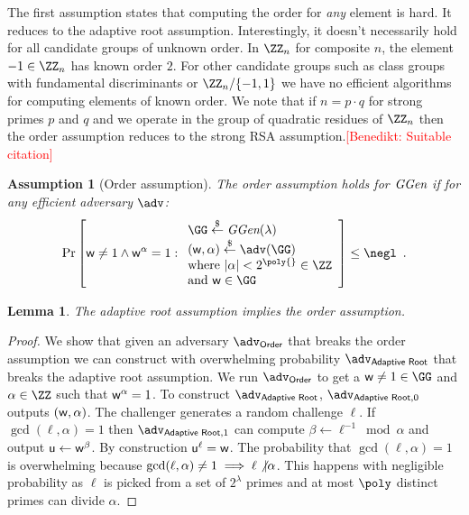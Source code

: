 \documentclass{article}
\newtheorem{lemma}{Lemma}
\newtheorem{assumption}{Assumption}
\newcommand{\benedikt}[1]{{\textcolor{red}{[Benedikt: #1]}}}
\newcommand{\benedikt}[1]{}
\begin{document}
The first assumption states that computing the order for \emph{any} element is hard. It reduces to the adaptive root assumption. Interestingly, it doesn't necessarily hold for all candidate groups of unknown order. In $\ZZ_n$ for composite $n$, the element $-1\in \ZZ_n$ has known order $2$. For other candidate groups such as class groups with fundamental discriminants or $\ZZ_n/\{-1,1\}$ we have no efficient algorithms for computing elements of known order. We note that if $n=p\cdot q$ for strong primes $p$ and $q$ and we operate in the group of quadratic residues of $\ZZ_n$ then the order assumption reduces to the strong RSA assumption.\benedikt{Suitable citation}
\begin{assumption}[Order assumption]
\label{assum:order}
	The order assumption holds for $\textit{GGen}$ if for any efficient adversary $\adv$:
\[        
                \Pr\left[\gr{w}\neq 1 \wedge \gr{w}^{\alpha}= 1: 
                \begin{array}{l} 
                      \GG \sample \ggen(\lambda) \\ 
                      (\gr{w},\alpha) \sample \adv(\GG) \\
                      \text{where } |\alpha|<2^{\poly{}}\in \ZZ\\
                      \text{and } \gr{w}\in \GG
                \end{array} 
        \right] \leq \negl \enspace .
\]
\end{assumption}
\begin{lemma}
\label{lem:ordertoadaptive}
	The adaptive root assumption implies the order assumption.
\end{lemma}
\begin{proof}
	We show that given an adversary $\adv_{\textsf{Order}}$ that breaks the order assumption we can construct with overwhelming probability $\adv_{\textsf{Adaptive Root}}$ that breaks the adaptive root assumption. We run $\adv_{\textsf{Order}}$ to get a $\gr{w}\neq 1\in \GG$ and $\alpha \in \ZZ$ such that $\mathsf{w}^{\alpha}=1$. To construct $\adv_{\textsf{Adaptive Root}}$, $\adv_{\textsf{Adaptive Root},0}$ outputs $(\mathsf{w},\alpha)$. The challenger generates a random challenge $\ell$. If $\gcd(\ell,\alpha)=1$ then $\adv_{\textsf{Adaptive Root},1}$ can compute $\beta\gets \ell^{-1} \bmod \alpha$ and output $\mathsf{u}\gets\mathsf{w}^{\beta}$. By construction $\mathsf{u}^{\ell}=\mathsf{w}$. The probability that $\gcd(\ell,\alpha)=1$ is overwhelming because $\gcd(\ell,\alpha)\neq 1 \implies \ell \not\vert \alpha$. This happens with negligible probability as $\ell$ is picked from a set of $2^\lambda$ primes and at most $\poly$ distinct primes can divide $\alpha$.
	\end{proof}
	
\end{document}

